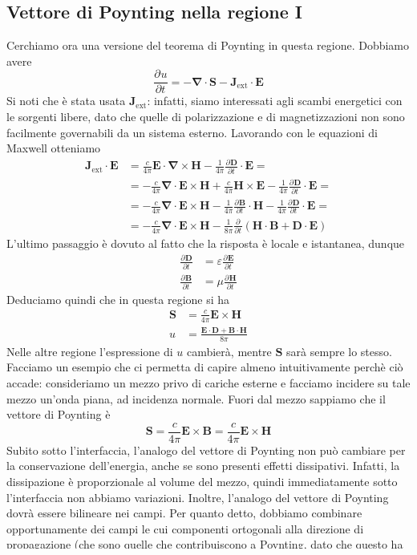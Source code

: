 \documentclass[a4paper,11pt]{book}
\newcommand{\der}[3][]{\frac{\partial ^{#1}#2}{\partial {#3}^{#1}}}
\let\oldnabla\nabla
\renewcommand{\nabla}{\vec{\oldnabla}}
\renewcommand{\vec}[1]{\mathbf{#1}}
\newcommand{\ext}{\textrm{ext}}
\theoremstyle{theorem}
\theoremstyle{definition}
\begin{document}
\subsection{Vettore di Poynting nella regione I}
Cerchiamo ora una versione del teorema di Poynting in questa regione. Dobbiamo avere
\[\der{u}{t}=-\nabla\cdot\vec{S}-\vec{J}_\ext\cdot\vec{E}\]
Si noti che è stata usata $\vec{J}_\ext$: infatti, siamo interessati agli scambi energetici con le sorgenti libere, dato che quelle di polarizzazione e di magnetizzazioni non sono facilmente governabili da un sistema esterno. Lavorando con le equazioni di Maxwell otteniamo
\begin{align*}
	\vec{J}_\ext\cdot\vec{E}&=\frac{c}{4\pi}\vec{E}\cdot\nabla\times\vec{H}-\frac{1}{4\pi}\der{\vec{D}}{t}\cdot\vec{E}=\\&=-\frac{c}{4\pi}\nabla\cdot\vec{E}\times\vec{H}+\frac{c}{4\pi}\vec{H}\times\vec{E}-\frac{1}{4\pi}\der{\vec{D}}{t}\cdot\vec{E}=\\&=-\frac{c}{4\pi}\nabla\cdot\vec{E}\times\vec{H}-\frac{1}{4\pi}\der{\vec{B}}{t}\cdot\vec{H}-\frac{1}{4\pi}\der{\vec{D}}{t}\cdot\vec{E}=\\&=-\frac{c}{4\pi}\nabla\cdot\vec{E}\times\vec{H}-\frac{1}{8\pi}\der{}{t}\left(\vec{H}\cdot\vec{B}+\vec{D}\cdot\vec{E}\right)
\end{align*}
L'ultimo passaggio è dovuto al fatto che la risposta è locale e istantanea, dunque
\begin{align*}
	\der{\vec{D}}{t}&=\varepsilon\der{\vec{E}}{t}\\
	\der{\vec{B}}{t}&=\mu\der{\vec{H}}{t}
\end{align*}
Deduciamo quindi che in questa regione si ha
\begin{align*}
	\vec{S}&=\frac{c}{4\pi}\vec{E}\times\vec{H}\\u&=\frac{\vec{E}\cdot\vec{D}+\vec{B}\cdot\vec{H}}{8\pi}
\end{align*}
Nelle altre regione l'espressione di $u$ cambierà, mentre $\vec{S}$ sarà sempre lo stesso. Facciamo un esempio che ci permetta di capire almeno intuitivamente perchè ciò accade: consideriamo un mezzo privo di cariche esterne e facciamo incidere su tale mezzo un'onda piana, ad incidenza normale. Fuori dal mezzo sappiamo che il vettore di Poynting è
\[\vec{S}=\frac{c}{4\pi}\vec{E}\times\vec{B}=\frac{c}{4\pi}\vec{E}\times\vec{H}\]
Subito sotto l'interfaccia, l'analogo del vettore di Poynting non può cambiare per la conservazione dell'energia, anche se sono presenti effetti dissipativi. Infatti, la dissipazione è proporzionale al volume del mezzo, quindi immediatamente sotto l'interfaccia non abbiamo variazioni. Inoltre, l'analogo del vettore di Poynting dovrà essere bilineare nei campi. Per quanto detto, dobbiamo combinare opportunamente dei campi le cui componenti ortogonali alla direzione di propagazione (che sono quelle che contribuiscono a Poynting, dato che questo ha la stessa direzione del vettore d'onda) siano continue all'interfaccia: questi campi sono proprio $\vec{E}$ e $\vec{H}$.
\end{document}
